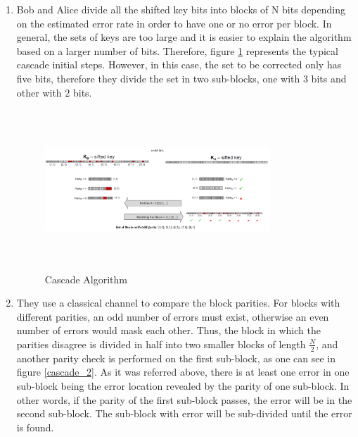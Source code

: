 \begin{enumerate}
\begin{enumerate}
        \item Bob and Alice divide all the shifted key bits into blocks of N bits depending on the estimated error rate in order to have one or no error per block. In general, the sets of keys are too large and it is easier to explain the algorithm based on a larger number of bits. Therefore, figure \ref{cascade_1} represents the typical cascade initial steps. However, in this case, the set to be corrected only has five bits, therefore they divide the set in two sub-blocks, one with $3$ bits and other with $2$ bits.

             \begin{figure}[h]
            	\centering
            	\includegraphics[width=0.8\textwidth, height=6cm]{./sdf/qokd_with_discrete_variables/figures/cascade_1.png}
                	\caption{Cascade Algorithm}\label{cascade_1}
            \end{figure}

        \item They use a classical channel to compare the block parities. For blocks with different parities, an odd number of errors must exist, otherwise an even number of errors would mask each other. Thus, the block in which the parities disagree is divided in half into two smaller blocks of length $\frac{N}{2}$, and another parity check is performed on the first sub-block, as one can see in figure \ref{cascade_2}. As it was referred above, there is at least one error in one sub-block being the error location revealed by the parity of one sub-block. In other words, if the parity of the first sub-block passes, the error will be in the second sub-block. The sub-block with error will be sub-divided until the error is found.


\end{enumerate}
\end{enumerate}
